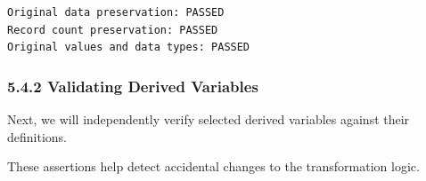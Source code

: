 \documentclass[11pt]{article}
\begin{document}
    \begin{Verbatim}[commandchars=\\\{\}]
Original data preservation: PASSED
Record count preservation: PASSED
Original values and data types: PASSED
    \end{Verbatim}

    \subsubsection{5.4.2 Validating Derived
Variables}\label{validating-derived-variables}

Next, we will independently verify selected derived variables against
their definitions.

These assertions help detect accidental changes to the transformation
logic.
\end{document}
